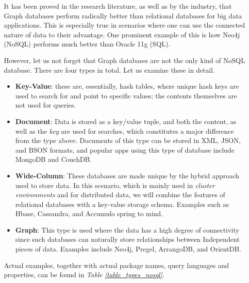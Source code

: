 \documentclass[10pt,        %
               a4paper,     %
               journal,     %
               ]{IEEEtran}
\begin{document}
It has been proved in the research literature, as well as by the industry, that Graph databases perform radically better than relational databases for big data applications. \cite{IEEEpaper1:comparison} This is especially true in scenarios where one can use the connected nature of data to their advantage. One prominent example of this is how Neo4j (NoSQL) performs much better than Oracle 11g (SQL). \cite{comparison_2015} \par
However, let us not forget that Graph databases are not the only kind of NoSQL database. There are four types in total. Let us examine these in detail. 
\begin{itemize}
	\item \textbf{Key-Value}: these are, essentially, hash tables, where unique hash keys are used to search for and point to specific values; the contents themselves are not used for queries.
	\item \textbf{Document}: Data is stored as a key/value tuple, and both the content, as well as the \textit{key} are used for searches, which constitutes a major difference from the type above. Documents of this type can be stored in XML, JSON, and BSON formats, and popular apps using this type of database include MongoDB and CouchDB.
	\item \textbf{Wide-Column}: These databases are made unique by the hybrid approach used to store data. In this scenario, which is mainly used in \textit{cluster environments} and for distributed data, we will combine the features of relational databases with a key-value storage schema. Examples such as Hbase, Cassandra, and Accumulo spring to mind.
	\item \textbf{Graph}: This type is used where the data has a high degree of connectivity since such databases can naturally store relationships between Independent pieces of data. Examples include Neo4j, Pregel, ArrangoDB, and OrientDB. 
\end{itemize}
Actual examples, together with actual package names, query languages and properties, can be found in \textit{Table \ref{table_types_nosql}}. \cite{IEEEpaper1:comparison}
\end{document}

